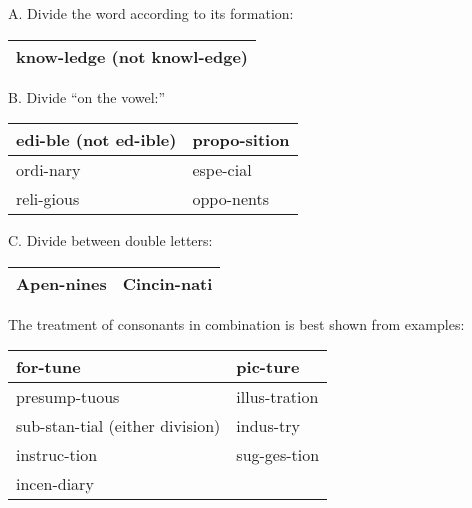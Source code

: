 \documentclass[10pt]{report}
\begin{document}
A. Divide the word according to its formation:
 \begin{table}[!tbh]
    \centering
        \begin{tabular}{|l|}
        \hline
    know-ledge (not knowl-edge)\\
        \hline
       
        
     
     
     
       
        

 \end{tabular}
 \end{table}
       
       
       B. Divide “on the vowel:”
  
  \begin{table}[!tbh]
    \centering
        \begin{tabular}{|l|l|}
       \hline edi-ble (not ed-ible) & propo-sition\\
       \hline
       
ordi-nary & espe-cial\\
\hline
reli-gious & oppo-nents\\
\hline

       
        

 \end{tabular}
 \end{table} 
 
 
 C. Divide between double letters: \\

\begin{table}[!tbh]
    \centering
        \begin{tabular}{|l|l|}
     \hline Apen-nines & Cincin-nati\\
    \hline 

       
        

 \end{tabular}
 \end{table} 

The treatment of consonants in combination is best shown from examples:

\newpage

\begin{table}[!tbh]
    \centering
        \begin{tabular}{|l|l|}
       \hline for-tune & pic-ture\\ \hline
presump-tuous & illus-tration \\
\hline

sub-stan-tial (either division)&  indus-try\\
\hline
instruc-tion & sug-ges-tion\\ \hline
incen-diary & \\
\hline


       
        

 \end{tabular}
 \end{table} 
 
\end{document}
